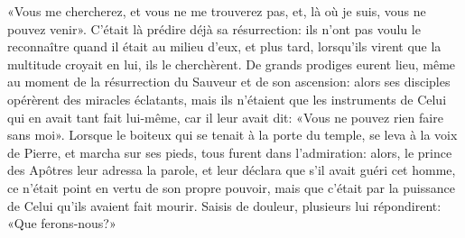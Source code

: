 «Vous me chercherez, et vous ne me trouverez pas,
	et, là où je suis, vous ne pouvez venir».
C’était là prédire déjà sa résurrection:
	ils n’ont pas voulu le reconnaître quand il était au milieu d’eux,
	et plus tard, lorsqu’ils virent que la multitude croyait en lui,
	ils le cherchèrent.
De grands prodiges eurent lieu,
	même au moment de la résurrection du Sauveur et de son ascension:
	alors ses disciples opérèrent des miracles éclatants,
	mais ils n’étaient que les instruments de Celui qui en avait tant fait lui-même,
	car il leur avait dit: «Vous ne pouvez rien faire sans moi».
Lorsque le boiteux qui se tenait à la porte du temple,
	se leva à la voix de Pierre, et marcha sur ses pieds,
	tous furent dans l’admiration:
	alors, le prince des Apôtres leur adressa la parole,
	et leur déclara que s’il avait guéri cet homme,
	ce n’était point en vertu de son propre pouvoir,
	mais que c’était par la puissance de Celui qu’ils avaient fait mourir.
Saisis de douleur, plusieurs lui répondirent:
	«Que ferons-nous?»
